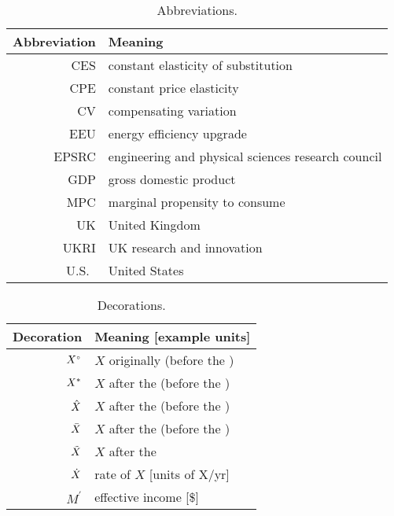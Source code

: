 
\begin{table}
\footnotesize
\centering %
\caption{Abbreviations.}
\begin{tabular}{r l}
  \toprule
  Abbreviation & Meaning \\
  \midrule
  CES    & constant elasticity of substitution \\
  CPE    & constant price elasticity \\
  CV     & compensating variation \\
  EEU    & energy efficiency upgrade \\
  EPSRC  & engineering and physical sciences research council \\
  GDP    & gross domestic product \\
  MPC    & marginal propensity to consume \\
  UK     & United Kingdom \\
  UKRI   & UK research and innovation \\
  U.S.\  & United States \\
  \bottomrule
\end{tabular}
\label{tab:abbreviations}
\end{table}



\begin{table}
\footnotesize
\centering %
\caption{Decorations.}
\begin{tabular}{r l}
  \toprule
  Decoration & Meaning [example units] \\
  \midrule
  ${}{X}^{\scriptscriptstyle \circ}$ & $X$ originally (before the \empleffect{}) \\
  ${X}^*$  & $X$ after the \empleffect{} (before the \subeffect{}) \\
  $\hat{X}$ & $X$ after the \subeffect{} (before the \inceffect{}) \\
  $\bar{X}$ & $X$ after the \inceffect{} (before the \macroeffect{}) \\
  $\tilde{X}$ & $X$ after the \macroeffect{} \\
  $\dot{X}$ & rate of $X$ [units of X/yr] \\
  $M^\prime$ & effective income [\$] \\
  \bottomrule
\end{tabular}
\label{tab:decorations}
\end{table}


